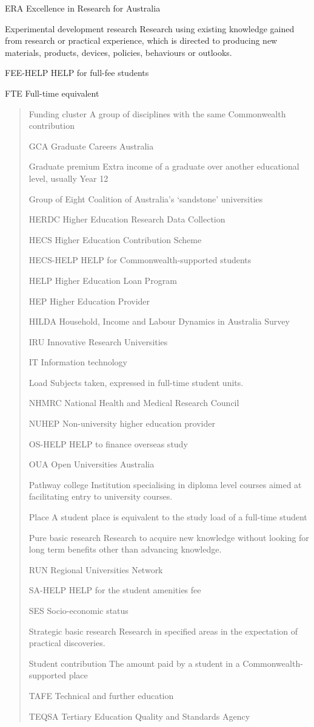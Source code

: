 \documentclass[]{book}
\begin{document}
ERA Excellence in Research for Australia

Experimental development research Research using existing knowledge gained from research or practical experience, which is directed to producing new materials, products, devices, policies, behaviours or outlooks.

FEE-HELP HELP for full-fee students

FTE Full-time equivalent

\begin{quote}
Funding cluster A group of disciplines with the same Commonwealth contribution

GCA Graduate Careers Australia

Graduate premium Extra income of a graduate over another educational level, usually Year 12

Group of Eight Coalition of Australia's `sandstone' universities

HERDC Higher Education Research Data Collection

HECS Higher Education Contribution Scheme

HECS-HELP HELP for Commonwealth-supported students

HELP Higher Education Loan Program

HEP Higher Education Provider

HILDA Household, Income and Labour Dynamics in Australia Survey

IRU Innovative Research Universities

IT Information technology

Load Subjects taken, expressed in full-time student units.

NHMRC National Health and Medical Research Council

NUHEP Non-university higher education provider

OS-HELP HELP to finance overseas study

OUA Open Universities Australia

Pathway college Institution specialising in diploma level courses aimed at facilitating entry to university courses.

Place A student place is equivalent to the study load of a full-time student

Pure basic research Research to acquire new knowledge without looking for long term benefits other than advancing knowledge.

RUN Regional Universities Network

SA-HELP HELP for the student amenities fee

SES Socio-economic status

Strategic basic research Research in specified areas in the expectation of practical discoveries.

Student contribution The amount paid by a student in a Commonwealth-supported place

TAFE Technical and further education

TEQSA Tertiary Education Quality and Standards Agency
\end{quote}
\end{document}

